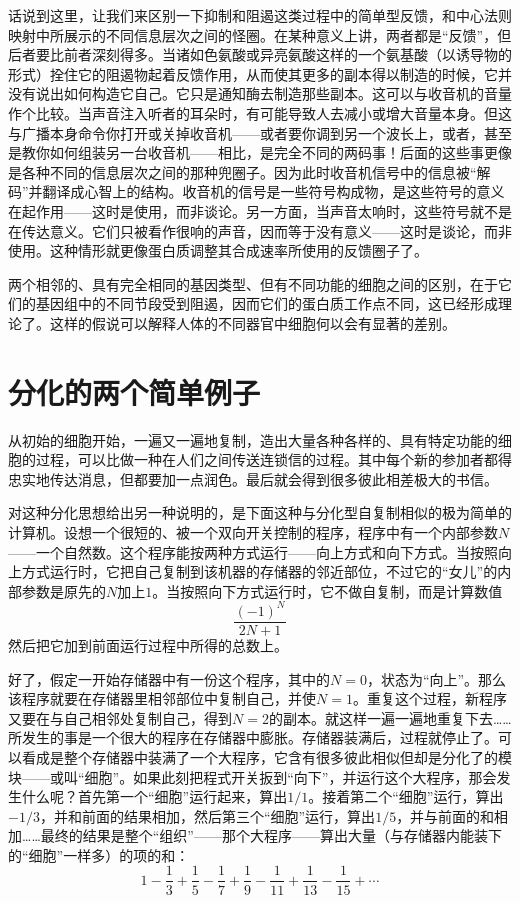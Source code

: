 话说到这里，让我们来区别一下抑制和阻遏这类过程中的简单型反馈，和中心法则映射中所展示的不同信息层次之间的怪圈。在某种意义上讲，两者都是“反馈”，但后者要比前者深刻得多。当诸如色氨酸或异亮氨酸这样的一个氨基酸（以诱导物的形式）拴住它的阻遏物起着反馈作用，从而使其更多的副本得以制造的时候，它并没有说出如何构造它自己。它只是通知酶去制造那些副本。这可以与收音机的音量作个比较。当声音注入听者的耳朵时，有可能导致人去减小或增大音量本身。但这与广播本身命令你打开或关掉收音机——或者要你调到另一个波长上，或者，甚至是教你如何组装另一台收音机——相比，是完全不同的两码事！后面的这些事更像是各种不同的信息层次之间的那种兜圈子。因为此时收音机信号中的信息被“解码”并翻译成心智上的结构。收音机的信号是一些符号构成物，是这些符号的意义在起作用——这时是使用，而非谈论。另一方面，当声音太响时，这些符号就不是在传达意义。它们只被看作很响的声音，因而等于没有意义——这时是谈论，而非使用。这种情形就更像蛋白质调整其合成速率所使用的反馈圈子了。

两个相邻的、具有完全相同的基因类型、但有不同功能的细胞之间的区别，在于它们的基因组中的不同节段受到阻遏，因而它们的蛋白质工作点不同，这已经形成理论了。这样的假说可以解释人体的不同器官中细胞何以会有显著的差别。

\section{分化的两个简单例子}

从初始的细胞开始，一遍又一遍地复制，造出大量各种各样的、具有特定功能的细胞的过程，可以比做一种在人们之间传送连锁信的过程。其中每个新的参加者都得忠实地传达消息，但都要加一点润色。最后就会得到很多彼此相差极大的书信。

对这种分化思想给出另一种说明的，是下面这种与分化型自复制相似的极为简单的计算机。设想一个很短的、被一个双向开关控制的程序，程序中有一个内部参数$N$——一个自然数。这个程序能按两种方式运行——向上方式和向下方式。当按照向上方式运行时，它把自己复制到该机器的存储器的邻近部位，不过它的“女儿”的内部参数是原先的$N$加上$1$。当按照向下方式运行时，它不做自复制，而是计算数值
\[
\frac{(-1)^N}{2N+1}
\]
然后把它加到前面运行过程中所得的总数上。

好了，假定一开始存储器中有一份这个程序，其中的$N=0$，状态为“向上”。那么该程序就要在存储器里相邻部位中复制自己，并使$N=1$。重复这个过程，新程序又要在与自己相邻处复制自己，得到$N=2$的副本。就这样一遍一遍地重复下去……所发生的事是一个很大的程序在存储器中膨胀。存储器装满后，过程就停止了。可以看成是整个存储器中装满了一个大程序，它含有很多彼此相似但却是分化了的模块——或叫“细胞”。如果此刻把程式开关扳到“向下”，并运行这个大程序，那会发生什么呢？首先第一个“细胞”运行起来，算出$1/1$。接着第二个“细胞”运行，算出$-1/3$，并和前面的结果相加，然后第三个“细胞”运行，算出$1/5$，并与前面的和相加……最终的结果是整个“组织”——那个大程序——算出大量（与存储器内能装下的“细胞”一样多）的项的和：
\[
1-\frac13+\frac15-\frac17+\frac19-\frac1{11}+\frac1{13}-\frac1{15}+\dotsb
\]

